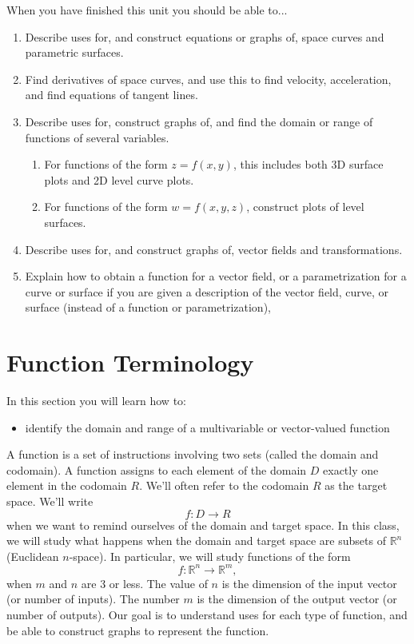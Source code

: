 
\noindent 
When you have finished this unit you should be able to...
\begin{enumerate}
\item Describe uses for, and construct equations or graphs of, space curves and parametric surfaces. 
\item Find derivatives of space curves, and use this to find velocity, acceleration, and find equations of tangent lines.
\item Describe uses for, construct graphs of, and find the domain or range of functions of several variables. 
\begin{enumerate}
	\item For functions of the form $z=f(x,y)$, this includes both 3D surface plots and 2D level curve plots.
	\item For functions of the form $w=f(x,y,z)$, construct plots of level surfaces.
\end{enumerate}
\item Describe uses for, and construct graphs of, vector fields and transformations.
\item Explain how to obtain a function for a vector field, or a parametrization for a curve or surface if you are given a description of the vector field, curve, or surface (instead of a function or parametrization), 
\end{enumerate}

\clearpage


\section{Function Terminology}
In this section you will learn how to:
\begin{itemize}
\item identify the domain and range of a multivariable or vector-valued function
\end{itemize}


A function is a set of instructions involving two sets (called the domain and codomain).  A function assigns to each element of the domain $D$ exactly one element in the codomain $R$. We'll often refer to the codomain $R$ as the target space.  We'll write $$f\colon D\to R$$ when we want to remind ourselves of the domain and target space.  In this class, we will study what happens when the domain and target space are subsets of ${\mathbb{R}}^n$ (Euclidean $n$-space).  In particular, we will study functions of the form $$f\colon {\mathbb{R}}^n\to {\mathbb{R}}^m,$$ when $m$ and $n$ are 3 or less. The value of $n$ is the dimension of the input vector (or number of inputs).  The number $m$ is the dimension of the output vector (or number of outputs).  Our goal is to understand uses for each type of function, and be able to construct graphs to represent the function.\\

